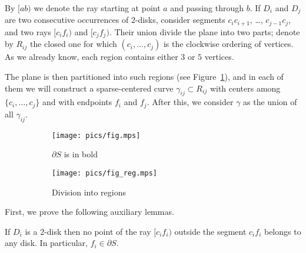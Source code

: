By $[ab)$ we denote the ray starting at point $a$ and passing through $b$. If $D_i$ and $D_j$ are two consecutive occurrences of $2$-disks, consider segments $c_ic_{i+1}$, \ldots, $c_{j-1}c_j$, and two rays $[c_if_i)$ and $[c_jf_j)$. Their union divide the plane into two parts; denote by $R_{ij}$ the closed one for which $(c_i, \ldots, c_j)$ is the clockwise ordering of vertices.
As we already know, each region contains either $3$ or $5$ vertices.

The plane is then partitioned into such regions (see Figure~\ref{fig:division-into-regions}), and in each of them we will construct a sparse-centered curve $\gamma_{ij}\subset R_{ij}$ with centers among $\{c_i, \ldots, c_j\}$ and with endpoints $f_i$ and $f_j$. After this, we consider $\gamma$ as the union of all $\gamma_{ij}$.

\begin{figure}[h!]
    \centering
    \begin{subfigure}{.4\textwidth}
    \texttt{[image: pics/fig.mps]}
    \caption{$\partial{S}$ is in bold}
    \end{subfigure}
    \begin{subfigure}{.4\textwidth}
    \texttt{[image: pics/fig\_reg.mps]}
    \caption{Division into regions}
    \label{fig:division-into-regions}
    \end{subfigure}
    \caption{}
    \label{fig:regions}
\end{figure}



First, we prove the following auxiliary lemmas.

\begin{lemma}
If $D_i$ is a $2$-disk then no point of the ray $[c_if_i)$ outside the segment $c_if_i$ belongs to any disk. In particular, $f_i\in\partial S$.
\label{lemma:far}
\end{lemma}

